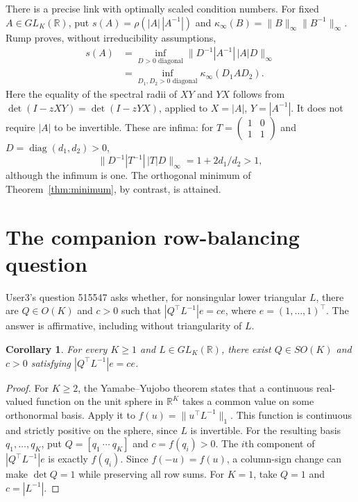 \documentclass[11pt]{article}
\newtheorem{corollary}[theorem]{Corollary}
\newcommand{\RR}{\mathbb R}
\newcommand{\diag}{\operatorname{diag}}
\begin{document}
There is a precise link with optimally scaled condition numbers. For fixed
$A\in GL_K(\RR)$, put $s(A)=\rho(|A|\,|A^{-1}|)$ and
$\kappa_\infty(B)=\|B\|_\infty\|B^{-1}\|_\infty$.
Rump \cite[Lemma 2.2 and Theorem 3.1]{rump} proves, without irreducibility
assumptions,
\begin{align*}
 s(A)&=\inf_{D>0\text{ diagonal}}
    \|D^{-1}|A^{-1}|\,|A|D\|_\infty\\
 &=\inf_{D_1,D_2>0\text{ diagonal}}\kappa_\infty(D_1AD_2).
\end{align*}
Here the equality of the spectral radii of $XY$ and $YX$ follows from
$\det(I-zXY)=\det(I-zYX)$, applied to $X=|A|$, $Y=|A^{-1}|$.
It does not require $|A|$ to be invertible.
These are infima: for $T=\left(\begin{smallmatrix}1&0\\1&1\end{smallmatrix}\right)$
and $D=\diag(d_1,d_2)>0$,
\[
 \|D^{-1}|T^{-1}|\,|T|D\|_\infty=1+2d_1/d_2>1,
\]
although the infimum is one. The orthogonal minimum of
Theorem~\ref{thm:minimum}, by contrast, is attained.

\section{The companion row-balancing question}

User3's question 515547 \cite{balance} asks whether, for nonsingular
lower triangular $L$, there are $Q\in O(K)$ and $c>0$ such that
$|Q^\top L^{-1}|e=ce$, where $e=(1,\ldots,1)^\top$.
The answer is affirmative, including without triangularity of $L$.

\begin{corollary}\label{cor:balance}
For every $K\geq1$ and $L\in GL_K(\RR)$, there exist $Q\in SO(K)$ and
$c>0$ satisfying $|Q^\top L^{-1}|e=ce$.
\end{corollary}

\begin{proof}
For $K\geq2$, the Yamabe--Yujobo theorem
\cite[p.~22, Theorem]{yamabe} states that a continuous real-valued
function on the unit sphere in $\RR^K$ takes a common value on some
orthonormal basis. Apply it to
$f(u)=\|u^\top L^{-1}\|_1$. This function is continuous and strictly
positive on the sphere, since $L$ is invertible. For the resulting basis
$q_1,\ldots,q_K$, put $Q=[q_1\ \cdots\ q_K]$ and $c=f(q_i)>0$.
The $i$th component of $|Q^\top L^{-1}|e$ is exactly $f(q_i)$.
Since $f(-u)=f(u)$, a column-sign change can make $\det Q=1$ while
preserving all row sums. For $K=1$, take $Q=1$ and $c=|L^{-1}|$.
\end{proof}
\end{document}
